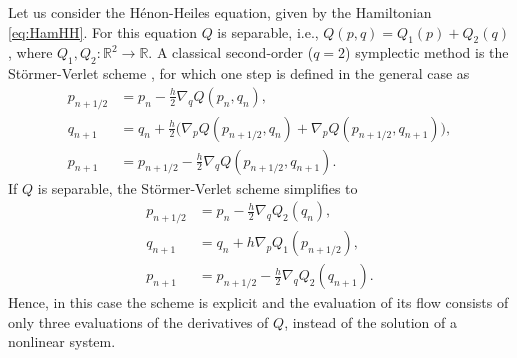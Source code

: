 \documentclass{siamart1116}
\numberwithin{theorem}{section}
\newcommand{\R}{\mathbb{R}}
\begin{document}
Let us consider the Hénon-Heiles equation, given by the Hamiltonian \eqref{eq:HamHH}. For this equation $Q$ is separable, i.e., $Q(p, q) = Q_1(p) + Q_2(q)$, where $Q_1, Q_2 \colon \R^2 \to \R$. A classical second-order ($q = 2$) symplectic method is the Störmer-Verlet scheme \cite{Sto07, Ver67, HLW06}, for which one step is defined in the general case as
\begin{equation}
\begin{aligned}
	p_{n+1/2} &= p_n - \frac{h}{2} \nabla_q Q(p_n, q_n), \\
	q_{n+1} &= q_n + \frac{h}{2} \big(\nabla_p Q(p_{n+1/2}, q_n) + \nabla_p Q(p_{n+1/2}, q_{n+1})\big),\\
	p_{n+1} &= p_{n+1/2} - \frac{h}{2} \nabla_q Q(p_{n+1/2}, q_{n+1}).
\end{aligned}
\end{equation}
If $Q$ is separable, the Störmer-Verlet scheme simplifies to
\begin{equation}
\begin{aligned}
	p_{n+1/2} &= p_n - \frac{h}{2} \nabla_q Q_2(q_n), \\
	q_{n+1} &= q_n + h \nabla_p Q_1(p_{n+1/2}),\\
	p_{n+1} &= p_{n+1/2} - \frac{h}{2} \nabla_q Q_2(q_{n+1}).
\end{aligned}
\end{equation}
Hence, in this case the scheme is explicit and the evaluation of its flow consists of only three evaluations of the derivatives of $Q$, instead of the solution of a nonlinear system. 
\end{document}
